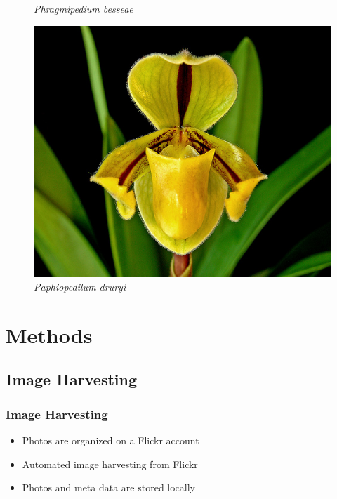 \documentclass[]{beamer}
\begin{document}
\begin{frame}
\begin{figure}[!htb]
              \caption*{\textit{Phragmipedium besseae}}
            \endminipage\hfill
              \includegraphics[width=\linewidth]{Paphiopedilum_druryi}
              \caption*{\textit{Paphiopedilum druryi}}
            \endminipage\hfill
        \end{figure}
    \end{frame}


\section{Methods}

    \subsection{Image Harvesting}

    \begin{frame}
        \frametitle{Image Harvesting}

        \begin{itemize}
            \item Photos are organized on a Flickr account
            \item Automated image harvesting from Flickr
            \item Photos and meta data are stored locally
        \end{itemize}
    \end{frame}
\end{document}
